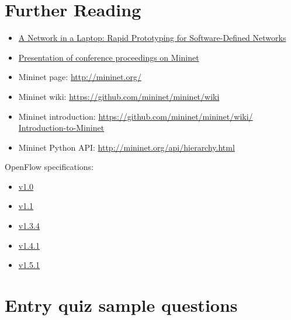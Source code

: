 \documentclass[a4paper]{article}
\begin{document}
\section{Further Reading}

\begin{itemize}
    \item \href{https://qosip.tmit.bme.hu/foswiki/pub/Meres/OpenFlowMScMeresiSegedlet/a19-lantz.pdf}{A Network in a
              Laptop: Rapid Prototyping for Software-Defined Networks}
    \item

          \href{https://qosip.tmit.bme.hu/foswiki/pub/Meres/OpenFlowMScMeresiSegedlet/mininet-hotnets2010-final.pdf}{Presentation
              of conference proceedings on Mininet}
    \item	Mininet page: \url{http://mininet.org/}
    \item	Mininet wiki: \url{https://github.com/mininet/mininet/wiki}
    \item	Mininet introduction: \url{https://github.com/mininet/mininet/wiki/  Introduction-to-Mininet}
    \item	Mininet Python API: \url{http://mininet.org/api/hierarchy.html}
\end{itemize}

OpenFlow specifications:
\begin{itemize}
    \item
          \href{https://qosip.tmit.bme.hu/foswiki/pub/Meres/OpenFlowMScMeresiSegedlet/openflow-spec-v1.0.0.pdf}{v1.0}
    \item
          \href{https://qosip.tmit.bme.hu/foswiki/pub/Meres/OpenFlowMScMeresiSegedlet/openflow-spec-v1.1.0.pdf}{v1.1}
    \item

          \href{https://qosip.tmit.bme.hu/foswiki/pub/Meres/OpenFlowMScMeresiSegedlet/openflow-switch-v1.3.4.pdf}{v1.3.4}
    \item

          \href{https://qosip.tmit.bme.hu/foswiki/pub/Meres/OpenFlowMScMeresiSegedlet/openflow-switch-v1.4.1.pdf}{v1.4.1}
    \item

          \href{https://qosip.tmit.bme.hu/foswiki/pub/Meres/OpenFlowMScMeresiSegedlet/openflow-switch-v1.5.1.pdf}{v1.5.1}

\end{itemize}

\appendix

\section{Entry quiz sample questions}
\end{document}
